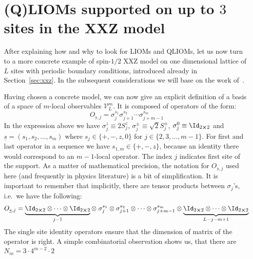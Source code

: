 
\section{(Q)LIOMs supported on up to \(3\) sites in the XXZ model\label{sec:example}}

After explaining how and why to look for LIOMs and QLIOMs, let us now turn to a more concrete
example of spin-\(1/2\) XXZ model on one dimensional lattice of \(L\) sites with periodic
boundary conditions, introduced already in Section~\ref{sec:xxz}. In the subsequent
considerations we will base on the work of~\textcite{Mierzejewski2015a}.

Having chosen a concrete model, we can now give an explicit definition of a basis
of a space of \(m\)-local observables \(\mathcal{V}_L^m\). It is composed of operators
of the form:
\begin{equation}
  O_{\underline{s},j}=\sigma_{j}^{s_{1}} \sigma_{j+1}^{s_{2}} \cdots 
  \sigma_{j+m-1}^{s_{m}}
  \label{eq:basis operator}
\end{equation}
In the expression above we have \(\sigma_j^z \equiv 2 S^z_j\),
\(\sigma_j^{\pm} \equiv \sqrt{2} S_j^{\pm}\), \(\sigma^{0}_j \equiv \Id_{2\cross 2}\) and
 \(\underline{s} = \left(s_1, s_2,\ldots, s_m\right)\) where \(s_j \in \{+,-,z,0\}\) for
 \(j \in \{2,3,\ldots,m-1\}\). For first and last operator in a sequence we have 
 \(s_{1,m} \in \{+,-,z\}\), because an identity there would correspond to an \(m-1\)-local
 operator. The index \(j\) indicates first site of the support.
As a matter of mathematical precision, the notation for \(O_{\underline{s},j}\) used here 
(and frequently in physics literature) is a bit of simplification. It is important to remember
that implicitly, there are tensor products between \(\sigma_j\)'s, i.e.\ we have the following:
\begin{equation}
  O_{\underline{s},j}= \underbrace{\Id_{2\cross 2} \otimes \cdots
       \otimes \Id_{2\cross 2}}_{j-1} \otimes \; \sigma_{j}^{s_{1}} \otimes \sigma_{j+1}^{s_{2}} \otimes
        \cdots \otimes \sigma_{j+m-1}^{s_{m}} \otimes 
        \underbrace{\Id_{2\cross 2} \otimes \cdots \otimes \Id_{2\cross 2}}_{L-j-m+1}
        \label{eq:basis with tensors}
\end{equation}
The single site identity operators ensure that the dimension of matrix of the operator is right.
A simple combinatorial observation shows us, that there are \(N_m = 3\cdot 4^{m-2}\cdot 2\)
